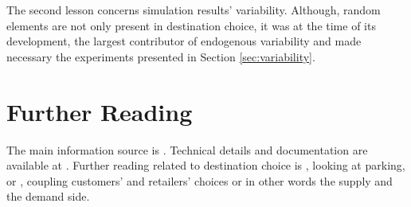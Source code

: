 The second lesson concerns simulation results' variability. Although, random elements are not only present in destination choice, it was at the time of its development, the largest contributor of endogenous variability and made necessary the experiments presented in Section \ref{sec:variability}.

\section{Further Reading}
The main information source is \citet[][]{Horni_PhDThesis_2013}. Technical details and documentation are available at \citet[][]{MATSIM-T-DC_Webpage_2014}. Further reading related to destination choice is \citet[][]{HorniEtAl_IATBRspec_2013}, looking at parking, or \citet[][]{HorniEtAl_TechRep_IVT_2012}, coupling customers' and retailers' choices or in other words the supply and the demand side.

